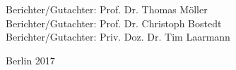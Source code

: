 \begin{fullsizetitle}
{\begin{tabbing}
\>Berichter/Gutachter: \> Prof. Dr. Thomas Möller \\
\>Berichter/Gutachter: \> Prof. Dr. Christoph Bostedt \\
\>Berichter/Gutachter: \> Priv. Doz. Dr. Tim Laarmann
%
\end{tabbing}
%
\leavevmode
\hspace{22mm}%
}
%
\begin{center}
%
\vspace{20mm}
%
{\large %
Berlin 2017}
%
\end{center}
%
\end{fullsizetitle}
%
%
